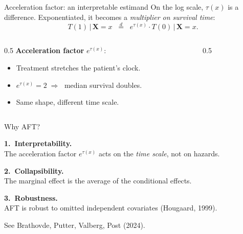 \documentclass[10pt,aspectratio=169]{beamer}
\begin{document}
\begin{frame}{Acceleration factor: an interpretable estimand}
On the log scale, $\tau(x)$ is a difference. Exponentiated, it becomes a \emph{multiplier on survival time}:
\[
T(1)\,\big|\,\bm{X}=x \;\;\overset{d}{=}\;\; e^{\tau(x)} \cdot T(0)\,\big|\,\bm{X}=x.
\]

\begin{columns}[T,onlytextwidth]
\begin{column}{0.5\textwidth}
\vspace{0.3cm}
\textbf{Acceleration factor} $e^{\tau(x)}$:
\begin{itemize}
  \item Treatment stretches the patient's clock.
  \item $e^{\tau(x)} = 2 \;\Rightarrow\;$ median survival doubles.
  \item Same shape, different time scale.
\end{itemize}
\end{column}
\begin{column}{0.5\textwidth}
\centering
\vspace{0.2cm}
\end{column}
\end{columns}
\end{frame}

\begin{frame}{Why AFT?}

\textbf{1.~Interpretability.}\\
The acceleration factor $e^{\tau(x)}$ acts on the \emph{time scale}, not on hazards.

\bigskip

\textbf{2.~Collapsibility.}\\
The marginal effect is the average of the conditional effects.

\bigskip

\textbf{3.~Robustness.}\\
AFT is robust to omitted independent covariates (Hougaard, 1999).

\vfill

\hfill{\footnotesize\color{myaccent}See Brathovde, Putter, Valberg, Post (2024).}
\end{frame}
\end{document}
